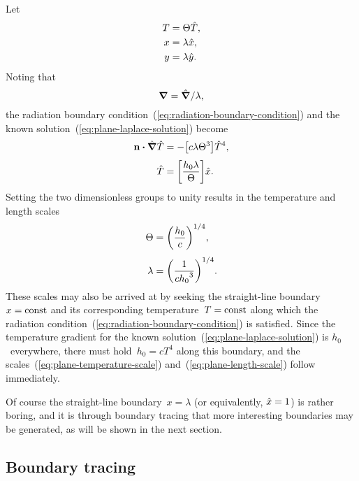Let
\begin{align}
  T &= \Theta \hat{T}, \label{eq:plane-temperature-scaling} \\
  x &= \lambda \hat{x}, \label{eq:plane-x-scaling} \\
  y &= \lambda \hat{y}. \label{eq:plane-y-scaling}
\end{align}
Noting that
\begin{equation}
  \mathop{}\!\boldsymbol{\mathbf{\nabla}} = \mathop{}\!\hat{\mathop{}\!\boldsymbol{\mathbf{\nabla}}} / \lambda,
  \label{eq:plane-del-scaling}
\end{equation}
the radiation boundary condition~(\ref{eq:radiation-boundary-condition})
and the known solution~(\ref{eq:plane-laplace-solution})
become
\begin{align}
  \normalvec \dotp \scaleddel \scaled{T}
    &= -\group{c \lambda \Theta^3} \scaled{T}^4,
    \label{eq:plane-scaled-radiation-boundary-condition-with-groups}
    \\[\tallspace]
  \scaled{T}
    &= \group{\frac{h_0 \lambda}{\Theta}} \scaled{x}.
    \label{eq:plane-scaled-laplace-solution-with-groups}
\end{align}
Setting the two dimensionless groups to unity
results in the temperature and length scales
\begin{align}
  \Theta &= \roundbr*{\frac{h_0}{c}}^{1/4},
    \label{eq:plane-temperature-scale} \\[\tallspace]
  \lambda &= \roundbr*{\frac{1}{c {h_0}^3}}^{1/4}.
    \label{eq:plane-length-scale}
\end{align}
These scales may also be arrived at
by seeking the straight-line boundary~$x = \mathrm{const}$
and its corresponding temperature~$T = \mathrm{const}$
along which the radiation condition~(\ref{eq:radiation-boundary-condition})
is satisfied.
Since the temperature gradient
for the known solution~(\ref{eq:plane-laplace-solution})
is $h_0$~everywhere,
there must hold~$h_0 = c T^4$ along this boundary,
and the scales~(\ref{eq:plane-temperature-scale})
and~(\ref{eq:plane-length-scale}) follow immediately.

Of course the straight-line boundary~$x = \lambda$
(or equivalently, $\hat{x} = 1$)
is rather boring,
and it is through boundary tracing
that more interesting boundaries may be generated,
as will be shown in the next section.

\subsection{Boundary tracing}
\label{sec:cartesian.plane.tracing}

